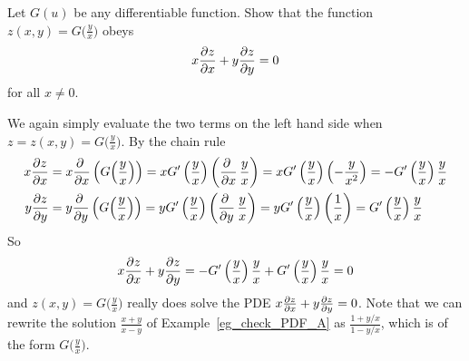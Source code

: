 \begin{eg}[$x\pdiff{z}{x}+ y\pdiff{z}{y}=0$, again]\label{eg_check_PDF_B}
Let $G(u)$ be any differentiable function.
Show that the function $z(x,y)=G\big(\frac{y}{x}\big)$ obeys
\begin{equation*}
x\pdiff{z}{x}+ y\pdiff{z}{y}=0
\end{equation*}
for all $x\ne 0$.

\soln
We again simply evaluate the two terms on the left hand side  when 
$z=z(x,y)=G\big(\frac{y}{x}\big)$. By the chain rule
\begin{align*}
x\pdiff{z}{x}&= x\pdiff{}{x}\left(G\Big(\frac{y}{x}\Big)\right)
=xG'\left(\frac{y}{x}\right)\left(\pdiff{}{x}\,\frac{y}{x}\right)
=xG'\left(\frac{y}{x}\right)\left(-\frac{y}{x^2}\right)
=-G'\left(\frac{y}{x}\right)\frac{y}{x} 
\\
y\pdiff{z}{y}&= y\pdiff{}{y}\left(G\Big(\frac{y}{x}\Big)\right)
=yG'\left(\frac{y}{x}\right)\left(\pdiff{}{y}\,\frac{y}{x}\right)
=yG'\left(\frac{y}{x}\right)\left(\frac{1}{x}\right)
=G'\left(\frac{y}{x}\right)\frac{y}{x} 
\end{align*}
So
\begin{equation*}
x\pdiff{z}{x} + y\pdiff{z}{y}
=-G'\left(\frac{y}{x}\right)\frac{y}{x} + G'\left(\frac{y}{x}\right)\frac{y}{x} 
=0
\end{equation*}
and 
$z(x,y)=G\big(\frac{y}{x}\big)$ really does solve the PDE
$
x\pdiff{z}{x}+ y\pdiff{z}{y}=0
$.
Note that we can rewrite the solution $\frac{x+y}{x-y}$ of 
Example~\ref{eg_check_PDF_A} as $\frac{1+y/x}{1-y/x}$, which is of the form 
$G\big(\frac{y}{x}\big)$.
\end{eg}


